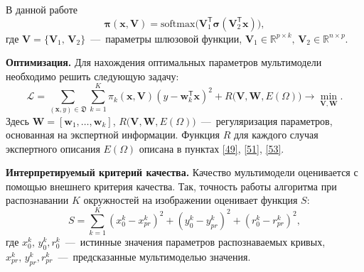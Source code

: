 \documentclass[12pt,twoside]{article}
\begin{document}
В данной работе
\begin{equation}
    \boldsymbol{\pi}(\mathbf{x}, \mathbf{V}) = \text{softmax}\bigl(\mathbf{V}_1^{\mathsf{T}}\boldsymbol{\sigma}(\mathbf{V}_2^{\mathsf{T}}\mathbf{x}) \bigr),
\end{equation}
где $\mathbf{V} = \{ \mathbf{V}_1, \, \mathbf{V}_2\}$~---~параметры шлюзовой функции, $\mathbf{V}_1 \in \mathbb{R}^{p \times k}, \, \mathbf{V}_2 \in \mathbb{R}^{n \times p}$. 

\textbf{Оптимизация.} Для нахождения оптимальных параметров мультимодели необходимо решить следующую задачу: \begin{equation}\label{9}
\mathcal{L} = \sum\limits_{(\mathbf{x}, y) \in \mathfrak{D}} \sum\limits_{k = 1}^{K} \pi_k(\mathbf{x}, \mathbf{V})(y - \mathbf{w}_k^{\mathsf{T}}\mathbf{x})^2 + R\bigl(\mathbf{V}, \mathbf{W}, E(\Omega)\bigr) \rightarrow \min_{\mathbf{V}, \mathbf{W}}.\end{equation} Здесь $\mathbf{W} = [\mathbf{w}_1, \dots, \mathbf{w}_k]$, $R\bigl(\mathbf{V}, \mathbf{W}, E(\Omega)\bigr)$~---~регуляризация параметров, основанная на экспертной информации. Функция $R$ для каждого случая экспертного описания $E(\Omega)$ описана в пунктах \eqref{49}, \eqref{51}, \eqref{53}.

\textbf{Интерпретируемый критерий качества.} Качество мультимодели оценивается с помощью внешнего критерия качества. Так, точность работы алгоритма при распознавании $K$ окружностей на изображении оценивает функция $S$: 
\begin{equation}
    S = \sum\limits_{k=1}^{K}(x_0^k - x_{pr}^k)^2+(y_0^k - y_{pr}^k)^2+(r_0^k - r_{pr}^k)^2,
\end{equation}
где $x_0^k, \, y_0^k, r_0^k$~---~истинные значения параметров распознаваемых кривых, $x_{pr}^k, \, y_{pr}^k, r_{pr}^k$~---~предсказанные мультимоделью значения.
\end{document}
